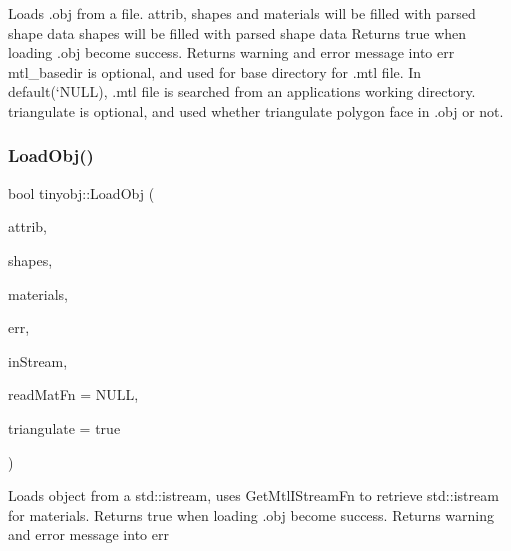 Loads .obj from a file. \textquotesingle{}attrib\textquotesingle{}, \textquotesingle{}shapes\textquotesingle{} and \textquotesingle{}materials\textquotesingle{} will be filled with parsed shape data \textquotesingle{}shapes\textquotesingle{} will be filled with parsed shape data Returns true when loading .obj become success. Returns warning and error message into {\ttfamily err} \textquotesingle{}mtl\+\_\+basedir\textquotesingle{} is optional, and used for base directory for .mtl file. In default(`\+N\+U\+LL\textquotesingle{}), .mtl file is searched from an application\textquotesingle{}s working directory. \textquotesingle{}triangulate\textquotesingle{} is optional, and used whether triangulate polygon face in .obj or not. \mbox{\label{namespacetinyobj_ad1e942879313375fcd1b08b7d6e7f89d}} 
\subsubsection{\texorpdfstring{Load\+Obj()}{LoadObj()}\hspace{0.1cm}{\footnotesize\ttfamily [2/2]}}
{\footnotesize\ttfamily bool tinyobj\+::\+Load\+Obj (\begin{DoxyParamCaption}\item[{\hyperlink{structtinyobj_1_1attrib__t}{attrib\+\_\+t} $\ast$}]{attrib,  }\item[{std\+::vector$<$ \hyperlink{structtinyobj_1_1shape__t}{shape\+\_\+t} $>$ $\ast$}]{shapes,  }\item[{std\+::vector$<$ \hyperlink{structtinyobj_1_1material__t}{material\+\_\+t} $>$ $\ast$}]{materials,  }\item[{std\+::string $\ast$}]{err,  }\item[{std\+::istream $\ast$}]{in\+Stream,  }\item[{\hyperlink{classtinyobj_1_1MaterialReader}{Material\+Reader} $\ast$}]{read\+Mat\+Fn = {\ttfamily NULL},  }\item[{bool}]{triangulate = {\ttfamily true} }\end{DoxyParamCaption})}

Loads object from a std\+::istream, uses Get\+Mtl\+I\+Stream\+Fn to retrieve std\+::istream for materials. Returns true when loading .obj become success. Returns warning and error message into {\ttfamily err} \mbox{\label{namespacetinyobj_add9ad979e8011ccdfac2e1ec8def5359}} 
